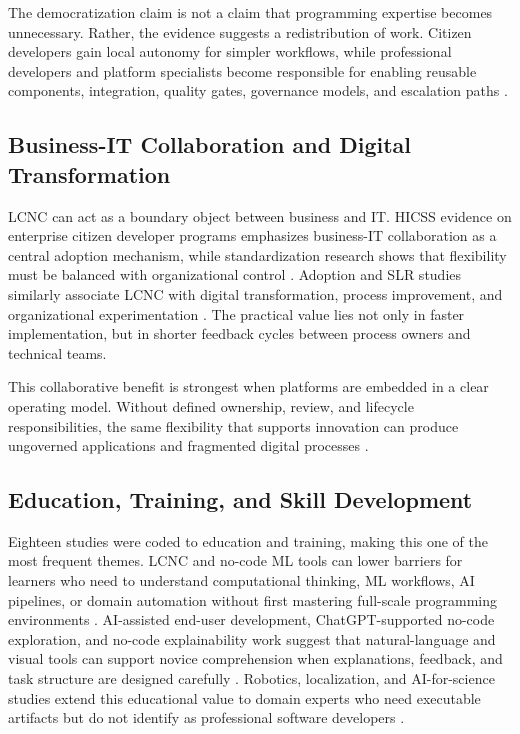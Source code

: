 \documentclass[conference]{IEEEtran}
\begin{document}
The democratization claim is not a claim that programming expertise becomes unnecessary. Rather, the evidence suggests a redistribution of work. Citizen developers gain local autonomy for simpler workflows, while professional developers and platform specialists become responsible for enabling reusable components, integration, quality gates, governance models, and escalation paths \cite{p16,p30,p47,p49}.

\subsection{Business-IT Collaboration and Digital Transformation}
LCNC can act as a boundary object between business and IT. HICSS evidence on enterprise citizen developer programs emphasizes business-IT collaboration as a central adoption mechanism, while standardization research shows that flexibility must be balanced with organizational control \cite{p12,p13}. Adoption and SLR studies similarly associate LCNC with digital transformation, process improvement, and organizational experimentation \cite{p14,p18}. The practical value lies not only in faster implementation, but in shorter feedback cycles between process owners and technical teams.

This collaborative benefit is strongest when platforms are embedded in a clear operating model. Without defined ownership, review, and lifecycle responsibilities, the same flexibility that supports innovation can produce ungoverned applications and fragmented digital processes \cite{p12,p15,p18}.

\subsection{Education, Training, and Skill Development}
Eighteen studies were coded to education and training, making this one of the most frequent themes. LCNC and no-code ML tools can lower barriers for learners who need to understand computational thinking, ML workflows, AI pipelines, or domain automation without first mastering full-scale programming environments \cite{p19,p28,p37,p39}. AI-assisted end-user development, ChatGPT-supported no-code exploration, and no-code explainability work suggest that natural-language and visual tools can support novice comprehension when explanations, feedback, and task structure are designed carefully \cite{p27,p44,p50}. Robotics, localization, and AI-for-science studies extend this educational value to domain experts who need executable artifacts but do not identify as professional software developers \cite{p01,p36,p45}.
\end{document}
